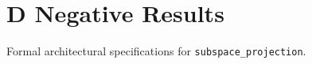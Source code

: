 \section{D Negative Results}

Formal architectural specifications for \texttt{subspace_projection}.
